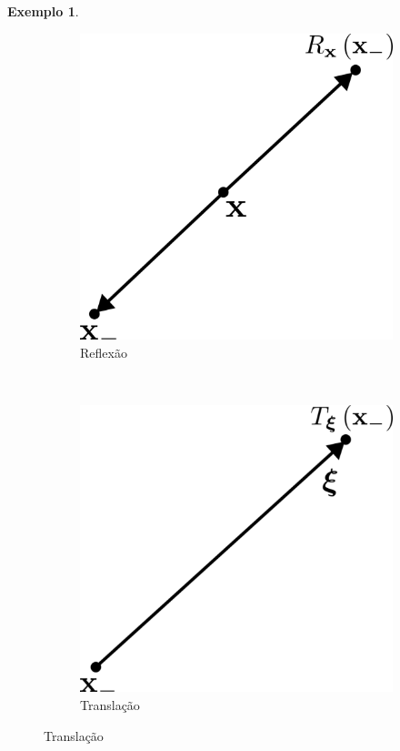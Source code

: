 \documentclass[
	12pt,
	oneside,			%
	a4paper,			%
	english,			%
	brazil				%
	]{abntex2}
\theoremstyle{definition}
\newtheorem{exmp}{Exemplo}[chapter]
\begin{document}
\begin{exmp}
\begin{figure}[H]
     \centering
     \begin{subfigure}[b]{0.3\textwidth}
         \centering
         \includegraphics[width=\textwidth]{Imagens/reflexão.png}
         \caption{Reflexão}
         \label{reflexão}
     \end{subfigure}
     ~ ~ ~ ~~~~~~~~
     \begin{subfigure}[b]{0.3\textwidth}
         \centering
         \includegraphics[width=\textwidth]{Imagens/translação.png}
         \caption{Translação}
         \label{translação}
     \end{subfigure}
        \label{reflexão e translação}
\end{figure}

\end{exmp}
\end{document}
